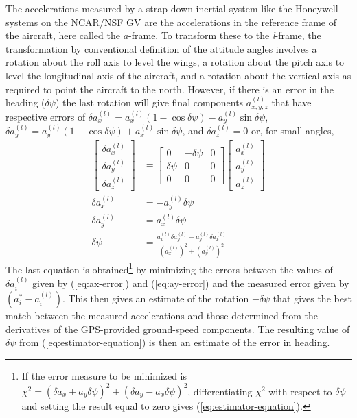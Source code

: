 \documentclass[english,british,amtd,bookmarks=false,unicode=true]{copernicus}\usepackage[]{graphicx}\usepackage[]{color}
\begin{document}
The accelerations measured by a strap-down inertial system like the
Honeywell systems on the NCAR/NSF GV are the accelerations in the
reference frame of the aircraft, here called the $a$-frame. To transform
these to the \emph{l}-frame, the transformation by conventional definition
of the attitude angles involves a rotation about the roll axis to
level the wings, a rotation about the pitch axis to level the longitudinal
axis of the aircraft, and a rotation about the vertical axis as required
to point the aircraft to the north. However, if there is an error
in the heading ($\delta\psi$) the last rotation will give final components
$a_{x,y,z}^{(l)}$ that have respective errors of $\delta a_{x}^{(l)}=a_{x}^{(l)}(1-\cos\delta\psi)-a_{y}^{(l)}\sin\delta\psi$,
$\delta a_{y}^{(l)}=a_{y}^{(l)}(1-\cos\delta\psi)+a_{x}^{(l)}\sin\delta\psi$,
and $\delta a_{z}^{(l)}=0$ or, for small angles,\\
\begin{align}
\left[\begin{array}{c}
\delta a_{x}^{(l)}\\
\delta a_{y}^{(l)}\\
\delta a_{z}^{(l)}
\end{array}\right] & =\left[\begin{array}{ccc}
0 & -\delta\psi & 0\\
\delta\psi & 0 & 0\\
0 & 0 & 0
\end{array}\right]\left[\begin{array}{c}
a_{x}^{(l)}\\
a_{y}^{(l)}\\
a_{z}^{(l)}
\end{array}\right]\label{eq:heading-error-equation}\\
\delta a_{x}^{(l)} & =-a_{y}^{(l)}\delta\psi\label{eq:ax-error}\\
\delta a_{y}^{(l)} & =a_{x}^{(l)}\delta\psi\label{eq:ay-error}\\
\delta\psi & =\frac{a_{x}^{(l)}\delta a_{y}^{(l)}-a_{y}^{(l)}\delta a_{x}^{(l)}}{(a_{x}^{(l)})^{2}+(a_{y}^{(l)})^{2}}\label{eq:estimator-equation}
\end{align}
The last equation is obtained\footnote{If the error measure to be minimized is $\chi^{2}=(\delta a_{x}+a_{y}\delta\psi)^{2}+(\delta a_{y}-a_{x}\delta\psi)^{2}$,
differentiating $\chi^{2}$ with respect to $\delta\psi$ and setting
the result equal to zero gives (\ref{eq:estimator-equation}).} by minimizing the errors between the values of $\delta a_{i}^{(l)}$
given by (\ref{eq:ax-error}) and (\ref{eq:ay-error}) and the measured
error given by $(a_{i}^{*}-a_{i}^{(l)})$. This then gives an estimate
of the rotation $-\delta\psi$ that gives the best match between the
measured accelerations and those determined from the derivatives of
the GPS-provided ground-speed components. The resulting value of $\delta\psi$
from (\ref{eq:estimator-equation}) is then an estimate of the error
in heading.
\end{document}
